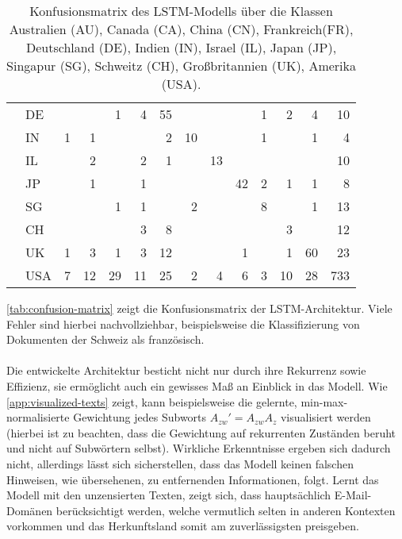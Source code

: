 \documentclass[bachelor,german]{info1thesis}
\begin{document}
\begin{table}[]
\begin{tabular}{@{}clrrrrrrrrrrrr@{}}
 & DE  &   &    & 1   & 4  & 55 &    &    &    & 1 & 2  & 4  & 10  \\
 & IN  & 1 & 1  &     &    & 2  & 10 &    &    & 1 &    & 1  & 4   \\
 & IL  &   & 2  &     & 2  & 1  &    & 13 &    &   &    &    & 10  \\
 & JP  &   & 1  &     & 1  &    &    &    & 42 & 2 & 1  & 1  & 8   \\
 & SG  &   &    & 1   & 1  &    & 2  &    &    & 8 &    & 1  & 13  \\
 & CH  &   &    &     & 3  & 8  &    &    &    &   & 3  &    & 12  \\
 & UK  & 1 & 3  & 1   & 3  & 12 &    &    & 1  &   & 1  & 60 & 23  \\
 & USA & 7 & 12 & 29  & 11 & 25 & 2  & 4  & 6  & 3 & 10 & 28 & 733 \\ \cmidrule(l){2-14} 
\end{tabular}
\caption{Konfusionsmatrix des LSTM-Modells über die Klassen Australien (AU), Canada (CA), China (CN), Frankreich(FR), Deutschland (DE), Indien (IN), Israel (IL), Japan (JP), Singapur (SG), Schweitz (CH), Großbritannien (UK), Amerika (USA).}
\label{tab:confusion-matrix}
\end{table}
%
\noindent\autoref{tab:confusion-matrix} zeigt die Konfusionsmatrix der LSTM-Architektur. Viele Fehler sind hierbei nachvollziehbar, beispielsweise die Klassifizierung von Dokumenten der Schweiz als französisch. \\ \\
Die entwickelte Architektur besticht nicht nur durch ihre Rekurrenz sowie Effizienz, sie ermöglicht auch ein gewisses Maß an Einblick in das Modell. Wie \autoref{app:visualized-texts} zeigt, kann beispielsweise die gelernte, min-max-normalisierte Gewichtung jedes Subworts $A_{zw}' = A_{zw}A_{z}$ visualisiert werden (hierbei ist zu beachten, dass die Gewichtung auf rekurrenten Zuständen beruht und nicht auf Subwörtern selbst). Wirkliche Erkenntnisse ergeben sich dadurch nicht, allerdings lässt sich sicherstellen, dass das Modell keinen falschen Hinweisen, wie übersehenen, zu entfernenden Informationen, folgt. Lernt das Modell mit den unzensierten Texten, zeigt sich, dass hauptsächlich E-Mail-Domänen berücksichtigt werden, welche vermutlich selten in anderen Kontexten vorkommen und das Herkunftsland somit am zuverlässigsten preisgeben. \\
%
\end{document}

